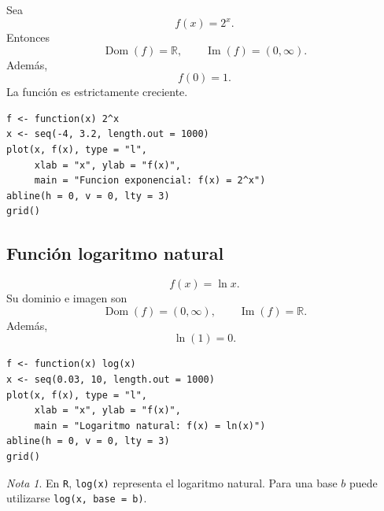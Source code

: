 \documentclass[12pt]{article}
\theoremstyle{remark}
\newtheorem{nota}{Nota}[section]
\newcommand{\R}{\mathbb{R}}
\newcommand{\Dom}{\operatorname{Dom}}
\newcommand{\Ima}{\operatorname{Im}}
\begin{document}
Sea
\[
f(x)=2^x.
\]
Entonces
\[
\Dom(f)=\R,\qquad \Ima(f)=(0,\infty).
\]
Además,
\[
f(0)=1.
\]
La función es estrictamente creciente.

\begin{center}
\end{center}

\begin{verbatim}
f <- function(x) 2^x
x <- seq(-4, 3.2, length.out = 1000)
plot(x, f(x), type = "l",
     xlab = "x", ylab = "f(x)",
     main = "Funcion exponencial: f(x) = 2^x")
abline(h = 0, v = 0, lty = 3)
grid()
\end{verbatim}

\subsection*{Función logaritmo natural}

\[
f(x)=\ln x.
\]
Su dominio e imagen son
\[
\Dom(f)=(0,\infty),
\qquad
\Ima(f)=\R.
\]
Además,
\[
\ln(1)=0.
\]

\begin{center}
\end{center}

\begin{verbatim}
f <- function(x) log(x)
x <- seq(0.03, 10, length.out = 1000)
plot(x, f(x), type = "l",
     xlab = "x", ylab = "f(x)",
     main = "Logaritmo natural: f(x) = ln(x)")
abline(h = 0, v = 0, lty = 3)
grid()
\end{verbatim}

\begin{nota}
En \texttt{R}, \texttt{log(x)} representa el logaritmo natural. Para una base
$b$ puede utilizarse \texttt{log(x, base = b)}.
\end{nota}
\end{document}
